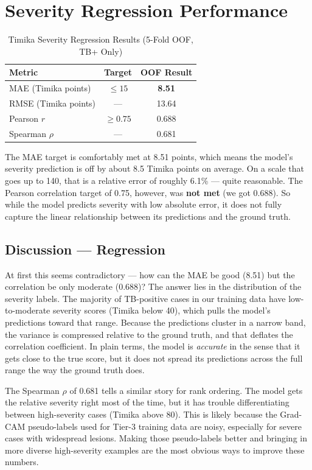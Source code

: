 \documentclass[12pt]{report}
\begin{document}
\section{Severity Regression Performance}

\begin{table}[H]
\centering
\caption{Timika Severity Regression Results (5-Fold OOF, TB+ Only)}
\label{tab:reg_results}
\renewcommand{\arraystretch}{1.2}
\begin{tabular}{|l|c|c|}
\hline
\textbf{Metric} & \textbf{Target} & \textbf{OOF Result} \\
\hline
MAE (Timika points) & $\leq 15$ & \textbf{8.51} \\
RMSE (Timika points) & --- & 13.64 \\
Pearson $r$ & $\geq 0.75$ & 0.688 \\
Spearman $\rho$ & --- & 0.681 \\
\hline
\end{tabular}
\end{table}

The MAE target is comfortably met at 8.51 points, which means the model's severity prediction is off by about 8.5 Timika points on average. On a scale that goes up to 140, that is a relative error of roughly 6.1\% --- quite reasonable. The Pearson correlation target of 0.75, however, was \textbf{not met} (we got 0.688). So while the model predicts severity with low absolute error, it does not fully capture the linear relationship between its predictions and the ground truth.

\subsection{Discussion --- Regression}

At first this seems contradictory --- how can the MAE be good (8.51) but the correlation be only moderate (0.688)? The answer lies in the distribution of the severity labels. The majority of TB-positive cases in our training data have low-to-moderate severity scores (Timika below 40), which pulls the model's predictions toward that range. Because the predictions cluster in a narrow band, the variance is compressed relative to the ground truth, and that deflates the correlation coefficient. In plain terms, the model is \textit{accurate} in the sense that it gets close to the true score, but it does not spread its predictions across the full range the way the ground truth does.

The Spearman $\rho$ of 0.681 tells a similar story for rank ordering. The model gets the relative severity right most of the time, but it has trouble differentiating between high-severity cases (Timika above 80). This is likely because the Grad-CAM pseudo-labels used for Tier-3 training data are noisy, especially for severe cases with widespread lesions. Making those pseudo-labels better and bringing in more diverse high-severity examples are the most obvious ways to improve these numbers.
\end{document}

